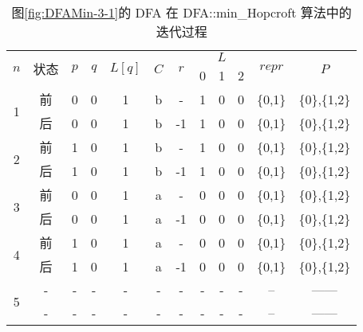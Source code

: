\begin{table}[!htbp]
    \caption{图\ref{fig:DFAMin-3-1}的 DFA 在 DFA::min\_Hopcroft 算法中的迭代过程}
    \label{tab:hopcroftAna}
    \centering
    \footnotesize%
    \setlength{\tabcolsep}{8pt}%
    \renewcommand{\arraystretch}{1.2}%
    \begin{tabular}{ccccccc|ccc|cc} 
        \toprule%
        \multirow{2}{*}{$n$} & \multirow{2}{*}{状态} & \multirow{2}{*}{$p$} & \multirow{2}{*}{$q$} & \multirow{2}{*}{$L[q]$} & \multirow{2}{*}{$C$} & \multirow{2}{*}{$r$} & \multicolumn{3}{c|}{$L$} & \multirow{2}{*}{$repr$} & \multirow{2}{*}{$P$}  \\
        \cline{8-10}             &                   &                     &                    &                       &                   &    & 0 & 1 &2 & & \\
        \midrule%
        \multirow{2}{*}{1} & 前 & 0 & 0 & 1 & b & -  & 1 & 0 & 0 & \{0,1\} & \{0\},\{1,2\} \\
                           & 后 & 0 & 0 & 1 & b & -1 & 1 & 0 & 0 & \{0,1\} & \{0\},\{1,2\} \\
        \midrule%
        \multirow{2}{*}{2} & 前 & 1 & 0 & 1 & b & -  & 1 & 0 & 0 & \{0,1\} & \{0\},\{1,2\} \\
                           & 后 & 1 & 0 & 1 & b & -1 & 1 & 0 & 0 & \{0,1\} & \{0\},\{1,2\} \\
        \midrule%
        \multirow{2}{*}{3} & 前 & 0 & 0 & 1 & a & -  & 0 & 0 & 0 & \{0,1\} & \{0\},\{1,2\} \\
                           & 后 & 0 & 0 & 1 & a & -1 & 0 & 0 & 0 & \{0,1\} & \{0\},\{1,2\} \\
        \midrule%
        \multirow{2}{*}{4} & 前 & 1 & 0 & 1 & a & -  & 0 & 0 & 0 & \{0,1\} & \{0\},\{1,2\} \\
                           & 后 & 1 & 0 & 1 & a & -1 & 0 & 0 & 0 & \{0,1\} & \{0\},\{1,2\} \\
        \midrule%
        \multirow{2}{*}{5} & - & - & - & - & - & -  & - & - & - & -- & ------ \\
                           & - & - & - & - & - & -  & - & - & - & -- & ------ \\
        \bottomrule%
    \end{tabular}
\end{table}

